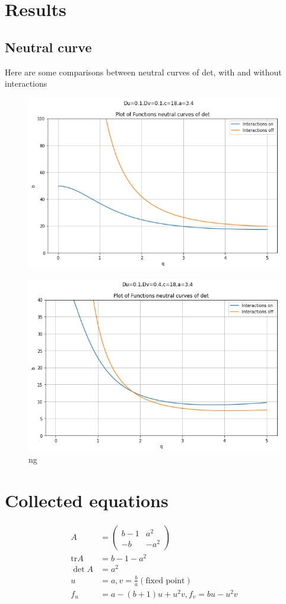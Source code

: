 \documentclass{article}
\newcommand{\tr}{\text{tr}}
\begin{document}
\section{Results}
\subsection{Neutral curve}
Here are some comparisons between neutral curves of det, with and without interactions
\begin{figure}[H]
\includegraphics[width=\textwidth]{images/plot_20240719_111506.png} 

\end{figure}
\begin{figure}[H]
\includegraphics[width=\textwidth]{images/plot_20240719_112606.png} ng

\end{figure}
\section{Collected equations}
\begin{align}
A&=\begin{pmatrix}b-1& a^2 \\ -b &-a^2\end{pmatrix}\\
\tr A &= b-1-a^2\\
\det A&= a^2\\
u&=a,v=\frac{b}{a} (\text{fixed point})\\
f_u &= a-(b+1)u+u^2v, f_v = bu-u^2v
\end{align}
\end{document}
